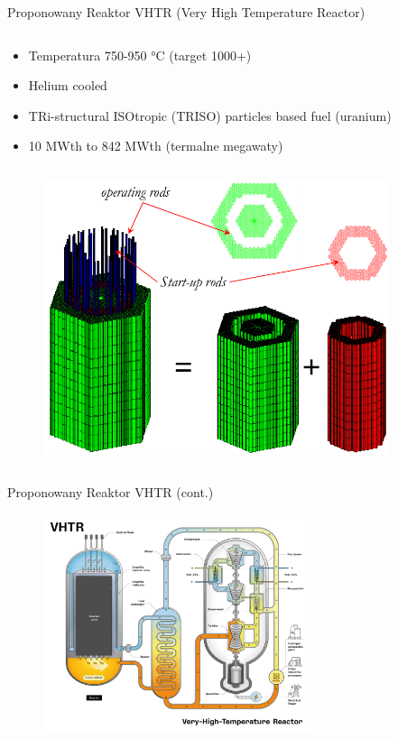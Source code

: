 \begin{columnframe}{Proponowany Reaktor VHTR (Very High Temperature Reactor)}
    \begin{column}{0.5\textwidth}
        \begin{itemize}
            \item Temperatura 750-950 \si{\degreeCelsius} (target 1000+)
            \item Helium cooled
            \item TRi-structural ISOtropic (TRISO) particles based fuel (uranium)
            \item 10 MWth to 842 MWth (termalne megawaty)
        \end{itemize}
    \end{column}
    \begin{column}{0.5\textwidth}
        \begin{figure}
            \centering
            \includegraphics[width=0.9\textwidth, frame]{images/vhtr_core.png}
        \end{figure}
    \end{column}
\end{columnframe}

\begin{frame}{Proponowany Reaktor VHTR (cont.)}
    \begin{figure}
        \centering
        \includegraphics[width=0.7\textwidth, frame]{images/VHTR.png}
    \end{figure}
\end{frame}

